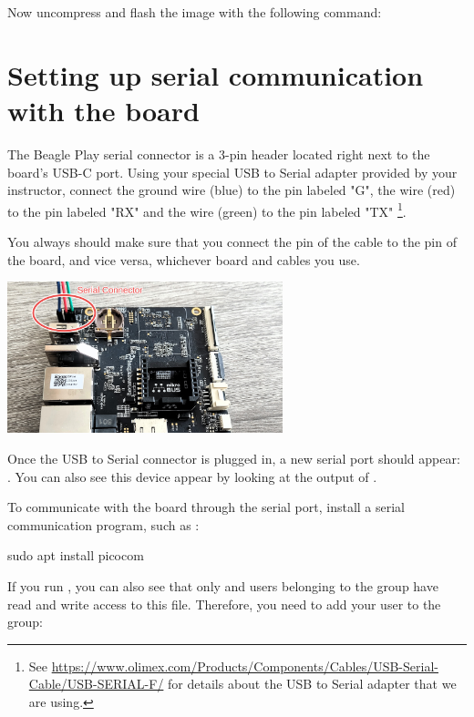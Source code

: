Now uncompress and flash the image with the following command:

\section{Setting up serial communication with the board}

The Beagle Play serial connector is a 3-pin header located right next to the
board's USB-C port. Using your special USB to Serial adapter provided  by your
instructor, connect the ground wire (blue) to the pin labeled "G", the
 wire (red) to the pin labeled "RX" and the  wire (green) to
the pin labeled "TX" \footnote{See \url{https://www.olimex.com/Products/Components/Cables/USB-Serial-Cable/USB-SERIAL-F/}
for details about the USB to Serial adapter that we are using.}.

You always should make sure that you connect the  pin of the cable
to the  pin of the board, and vice versa, whichever board and
cables you use.

\begin{center}
\includegraphics[width=8cm]{common/beagleplay-serial-connection.jpg}
\end{center}

Once the USB to Serial connector is plugged in, a new serial port
should appear: .  You can also see this device
appear by looking at the output of .

To communicate with the board through the serial port, install a
serial communication program, such as :

\begin{bashinput}
sudo apt install picocom
\end{bashinput}

If you run , you can also see that only
 and users belonging to the  group have
read and write access to this file. Therefore, you need to add your user
to the  group:

